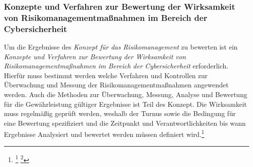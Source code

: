 \documentclass[11pt,a4paper,hidelinks]{article}   %
\begin{document}
            \subsubsection{Konzepte und Verfahren zur Bewertung der Wirksamkeit von Risikomanagementmaßnahmen im Bereich der Cybersicherheit}
            Um die Ergebnisse des \emph{Konzept für das Risikomanagement} zu bewerten ist ein \emph{Konzepte und Verfahren zur Bewertung der Wirksamkeit von Risikomanagementmaßnahmen im Bereich der Cybersicherheit} erforderlich. Hierfür muss bestimmt werden welche Verfahren und Kontrollen zur Überwachung und Messung der Risikomanagementmaßnahmen angewendet werden. Auch die Methoden zur Überwachung, Messung, Analyse und Bewertung für die Gewährleistung gültiger Ergebnisse ist Teil des Konzept. Die Wirksamkeit muss regelmäßig geprüft werden, weshalb der Turnus sowie die Bedingung für eine Bewertung spezifiziert und die Zeitpunkt und Verantwortlichkeiten bis wann Ergebnisse Analysiert und bewertet werden müssen definiert wird.\footnote{
                \footcite[Vgl.][, Anhang, Nummer 7.1. \& 7.2.]{EU2024-2690}
                \footcite[Vgl.][, §30 Absatz 2, Nummer 6]{NIS2UmsuCG}
            }

\end{document}
